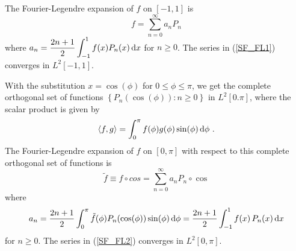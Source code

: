 The Fourier-Legendre expansion of $f$ on $[-1,1]$ is
\begin{equation} \label{SF_FL1}
f = \sum_{n=0}^{\infty}  a_n  P_n
\end{equation}
where
$\displaystyle a_n  =  \frac{2n+1}{2} \int_{-1}^{1} f(x) P_n(x)\,\mathrm{d}{x}$
for $n \geq 0$.  The series in (\ref{SF_FL1}) converges in
$\displaystyle L^2[-1,1]$.

With the substitution $x=\cos(\phi)$ for
$0\leq \phi \leq \pi$, we get the complete orthogonal set of functions
$\displaystyle \left\{P_n(\cos(\phi)) : n \geq 0 \right\}$
in $\displaystyle L^2[0.\pi]$, where the scalar product is given by
\[
\left\langle{f} , {g}\right\rangle = \int_0^\pi f(\phi) g(\phi) \sin(\phi) \,\mathrm{d}{\phi} \ .
\]
The Fourier-Legendre expansion of $f$ on $[0,\pi]$ with respect to
this complete orthogonal set of functions is
\begin{equation} \label{SF_FL2}
  \tilde{f} \equiv f \circ cos = \sum_{n=0}^{\infty} a_n P_n \circ \cos
\end{equation}
where
\[
a_n = \frac{2n+1}{2} \int_{0}^{\pi} \tilde{f}(\phi) P_n(\cos(\phi))
\sin(\phi) \,\mathrm{d}{\phi}
= \frac{2n+1}{2} \int_{-1}^{1} f(x)\, P_n(x) \,\mathrm{d}{x}
\]
for $n \geq 0$.  The series in (\ref{SF_FL2}) converges in
$\displaystyle L^2[0,\pi]$.

